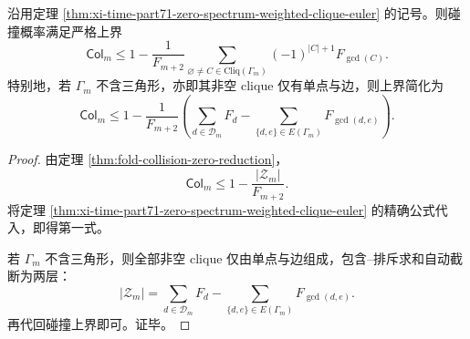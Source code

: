 \begin{corollary}\label{cor:xi-time-part71-collision-upper-bound-weighted-clique-euler}
沿用定理 \ref{thm:xi-time-part71-zero-spectrum-weighted-clique-euler} 的记号。则碰撞概率满足严格上界
\[
\mathsf{Col}_m
\le
1-\frac{1}{F_{m+2}}
\sum_{\varnothing\neq C\in \mathrm{Cliq}(\Gamma_m)}
(-1)^{|C|+1}F_{\gcd(C)}.
\]
特别地，若 \(\Gamma_m\) 不含三角形，亦即其非空 clique 仅有单点与边，则上界简化为
\[
\mathsf{Col}_m
\le
1-\frac{1}{F_{m+2}}
\left(
\sum_{d\in\mathcal D_m}F_d
-
\sum_{\{d,e\}\in E(\Gamma_m)}F_{\gcd(d,e)}
\right).
\]
\end{corollary}
\begin{proof}
由定理 \ref{thm:fold-collision-zero-reduction}，
\[
\mathsf{Col}_m\le 1-\frac{|\mathcal Z_m|}{F_{m+2}}.
\]
将定理 \ref{thm:xi-time-part71-zero-spectrum-weighted-clique-euler} 的精确公式代入，即得第一式。

若 \(\Gamma_m\) 不含三角形，则全部非空 clique 仅由单点与边组成，包含--排斥求和自动截断为两层：
\[
|\mathcal Z_m|
=
\sum_{d\in\mathcal D_m}F_d
-
\sum_{\{d,e\}\in E(\Gamma_m)}F_{\gcd(d,e)}.
\]
再代回碰撞上界即可。证毕。
\end{proof}

